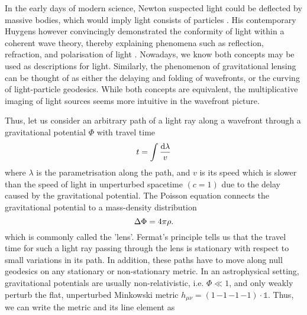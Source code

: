 
In the early days of modern science, Newton suspected light could be deflected
by massive bodies, which would imply light consists of particles
.  His contemporary Huygens however convincingly
demonstrated the conformity of light within a coherent wave theory, thereby
explaining phenomena such as reflection, refraction, and polarisation of light
.  Nowadays, we know both concepts may be used as
descriptions for light.  Similarly, the phenomenon of gravitational lensing can
be thought of as either the delaying and folding of wavefronts, or the curving
of light-particle geodesics.  While both concepts are equivalent, the
multiplicative imaging of light sources seems more intuitive in the wavefront
picture.

Thus, let us consider an arbitrary path of a light ray along a wavefront through
a gravitational potential $\Phi$ with travel time
%
\begin{equation}\eqlbl{travel_time}%
  t = \int \frac{\mathrm{d}\lambda}{v}
\end{equation}%
%
where $\lambda$ is the parametrisation along the path, and $v$ is its speed
which is slower than the speed of light in unperturbed spacetime $(c=1)$ due to
the delay caused by the gravitational potential.  
The Poisson equation connects the gravitational potential to a mass-density distribution
%
%
\begin{equation}\eqlbl{Poisson}%
  \Delta\Phi = 4\pi\rho.
\end{equation}%
%
which is commonly called the 'lens'.  Fermat's principle tells us that the travel
time for such a light ray passing through the lens is stationary with respect to
small variations in its path.  In addition, these paths have to move along null
geodesics on any stationary or non-stationary metric.  In an astrophysical
setting, gravitational potentials are usually non-relativistic,
i.e. $\Phi \ll 1$, and only weakly perturb the flat, unperturbed Minkowski
metric $h_{\mu\nu} = ({1}\,{-1}\,{-1}\,{-1})\cdot\mathbb{1}$.  Thus, we can
write the metric and its line element as
%
